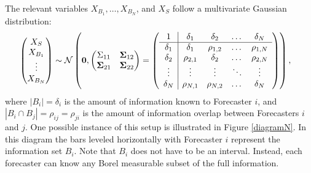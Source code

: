 \documentclass[12pt]{article}
\theoremstyle{definition}
\theoremstyle{definition}
\begin{document}
 The relevant variables $X_{B_1}, \dots, X_{B_N}$, and $X_S$ follow a multivariate Gaussian distribution: 
\begin{align}
\left(\begin{matrix} X_S \\ X_{B_1}\\ \vdots \\ X_{B_N} \end{matrix}\right) &\sim \mathcal{N}\left( 
 \boldsymbol{0}, \left(\begin{matrix} 
\Sigma_{11} & {\bf \Sigma}_{12}\\
{\bf\Sigma}_{21} & {\bf \Sigma}_{22}\\
 \end{matrix}\right) 
 =
 \left(\begin{array}{c | c c cc }
1 & \delta_1 & \delta_2 & \dots & \delta_N  \\ \hline
\delta_1 & \delta_1 &\rho_{1,2} & \dots & \rho_{1,N}   \\ 
\delta_2 & \rho_{2,1} & \delta_2 & \dots & \rho_{2,N}  \\ 
\vdots & \vdots & \vdots & \ddots & \vdots  \\ 
\delta_N & \rho_{N,1} & \rho_{N,2} & \dots & \delta_N\\ 
 \end{array}\right)\right),  \label{Nforecasters}
\end{align}
where $|B_i| = \delta_i$ is the amount of information known to Forecaster $i$, and $|B_i \cap B_j| = \rho_{ij} = \rho_{ji}$ is the amount of information overlap between Forecasters $i$ and $j$. One possible instance of this setup is illustrated in Figure \ref{diagramN}. In this diagram the bars leveled horizontally with Forecaster $i$ represent the information set $B_i$. Note that $B_i$ does not have to be an interval.  Instead, each forecaster can know any Borel measurable
subset of the full information. 
\end{document}
